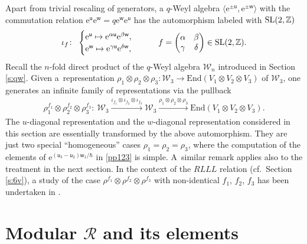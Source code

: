 \documentclass[pdftex]{sigma}
\newcommand{\Z}{{\mathbb Z}}
\newcommand{\e}{{\mathrm e}}
\newcommand{\uu}{{\mathsf u}}
\newcommand{\ww}{{\mathsf w}}
\numberwithin{equation}{section}
\begin{document}
\begin{Remark}
Apart from trivial rescaling of generators,
a $q$-Weyl algebra $\bigl\langle \e^{\pm \uu}, \e^{\pm \ww}\bigr\rangle$
with the commutation relation
$\e^\uu \e^\ww = q \e^\ww \e^\uu$
has the automorphism labeled with ${\rm SL}(2,\Z)$
\[
\iota_f\colon\
\begin{cases}\e^\uu \mapsto \e^{\alpha \uu} \e^{\beta \ww},
\\
\e^\ww \mapsto \e^{\gamma \uu} \e^{\delta \ww},
\end{cases}
\qquad
f= \begin{pmatrix} \alpha & \beta \\ \gamma & \delta \end{pmatrix}
\in {\rm SL}(2,\Z).
\]
Recall the $n$-fold direct product of the $q$-Weyl algebra $\mathcal{W}_n$ introduced in Section \ref{s:qw}.
Given a~representation $\rho_1 \otimes \rho_2 \otimes \rho_3\colon \mathcal{W}_3
\rightarrow \mathrm{End}(V_1 \otimes V_2 \otimes V_3)$ of $\mathcal{W}_3$,
one generates an infinite family of representations via the pullback
\begin{align*}%
\rho^{f_1}_1 \otimes \rho^{f_2}_2 \otimes \rho^{f_3}_3\colon\
\mathcal{W}_3\xrightarrow{\iota_{f_1} \otimes \iota_{f_2} \otimes \iota_{f_3}}
\mathcal{W}_3
\xrightarrow{\rho_1 \otimes \rho_2 \otimes \rho_3}
\mathrm{End}(V_1 \otimes V_2 \otimes V_3).
\end{align*}
The $u$-diagonal representation and the $w$-diagonal representation
considered in this section are essentially transformed by the above
automorphism. They are just two special ``homogeneous'' cases
$\rho_1=\rho_2=\rho_3$, where the computation of the elements of
$\e^{(\uu_3-\uu_2)\ww_1/\hbar}$ in \eqref{pp123} is simple. A~similar
remark applies also to the treatment in the next section. In the
context of the $RLLL$ relation (cf.\ Section \ref{s:6v}), a study of
the case $\rho^{f_1} \otimes \rho^{f_2} \otimes \rho^{f_3}$ with
non-identical $f_1$, $f_2$, $f_3$ has been undertaken in \cite{KMY23}.
\end{Remark}

\section[Modular R and its elements]{Modular $\boldsymbol{\mathcal{R}}$ and its elements}\label{s:md}
\end{document}

